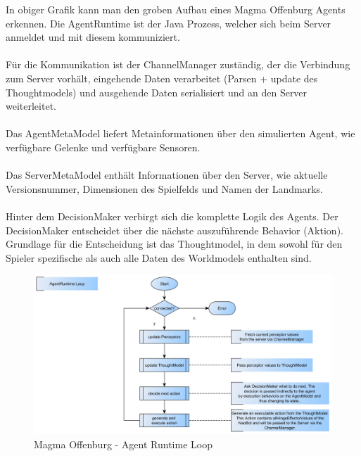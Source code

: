 \documentclass[fontsize=12pt,a4paper,final]{scrartcl}[2003/01/01]
\begin{document}
In obiger Grafik kann man den groben Aufbau eines Magma Offenburg Agents erkennen. Die AgentRuntime ist der Java Prozess, welcher sich beim Server anmeldet und mit diesem kommuniziert. \\
\\
Für die Kommunikation ist der ChannelManager zuständig,  der die Verbindung zum Server vorhält, eingehende Daten verarbeitet (Parsen + update des Thoughtmodels) und ausgehende Daten serialisiert und an den Server weiterleitet.\\
\\
Das AgentMetaModel liefert Metainformationen über den simulierten Agent, wie verfügbare Gelenke und verfügbare Sensoren.\\
\\
Das ServerMetaModel enthält Informationen über den Server, wie aktuelle Versionsnummer, Dimensionen des Spielfelds und Namen der Landmarks.\\
\\
Hinter dem DecisionMaker verbirgt sich die komplette Logik des Agents. Der DecisionMaker entscheidet über die nächste auszuführende Behavior (Aktion). Grundlage für die Entscheidung ist das Thoughtmodel, in dem sowohl für den Spieler spezifische als auch alle Daten des Worldmodels enthalten sind.

\begin{figure}[H]
	\centering
	\includegraphics[width=\textwidth]{Grafiken/Magma/AgentRuntime_Loop}
	\caption{Magma Offenburg - Agent Runtime Loop}
	\label{fig:Magma - Agent Runtime Loop}
\end{figure}
\end{document}
